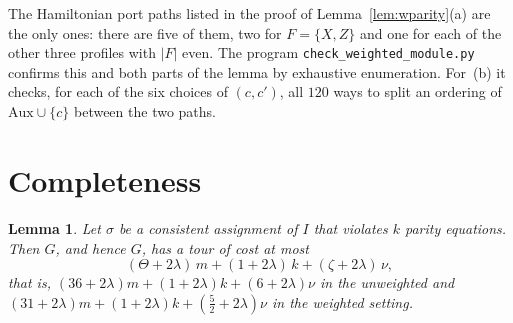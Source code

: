 \documentclass[11pt]{amsart}
\newtheorem{lemma}[theorem]{Lemma}
\theoremstyle{definition}
\theoremstyle{remark}
\numberwithin{equation}{section}
\newcommand{\Aux}{\mathrm{Aux}}
\newcommand{\Gh}{\widehat{G}}
\begin{document}
The Hamiltonian port paths listed in the proof of Lemma~\ref{lem:wparity}(a) are the only ones: there are five of them, two for $F=\{X,Z\}$ and one for each of the other three profiles with $|F|$ even. The program \texttt{check\_weighted\_module.py} confirms this and both parts of the lemma by exhaustive enumeration. For~(b) it checks, for each of the six choices of $(c,c')$, all $120$ ways to split an ordering of $\Aux\cup\{c\}$ between the two paths.

\section{Completeness}\label{sec:completeness}

\begin{lemma}\label{lem:completeness}
Let $\sigma$ be a consistent assignment of $I$ that violates $k$ parity equations. Then $\Gh$, and hence $G$, has a tour of cost at most
\[
(\Theta+2\lambda)\,m+(1+2\lambda)\,k+(\zeta+2\lambda)\,\nu ,
\]
that is, $(36+2\lambda)m+(1+2\lambda)k+(6+2\lambda)\nu$ in the unweighted and $(31+2\lambda)m+(1+2\lambda)k+(\frac52+2\lambda)\nu$ in the weighted setting.
\end{lemma}
\end{document}
